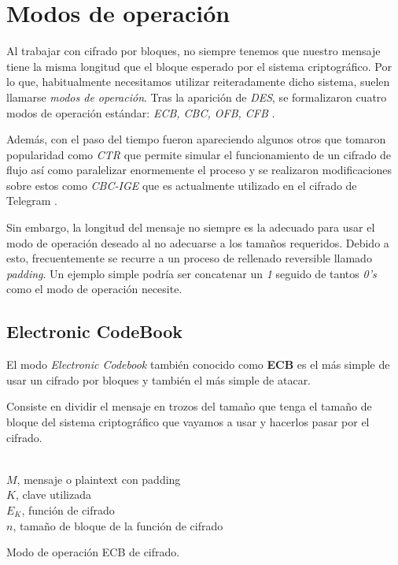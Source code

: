 \chapter{Modos de operación}
\label{chp:modes}

Al trabajar con cifrado por bloques, no siempre tenemos que nuestro mensaje tiene la misma longitud que el bloque esperado por el sistema criptográfico. Por lo que, habitualmente necesitamos utilizar reiteradamente dicho sistema, suelen llamarse \textit{modos de operación}. Tras la aparición de \textit{DES}, se formalizaron cuatro modos de operación estándar: \textit{ECB, CBC, OFB, CFB} \cite{Crypto_Bases2}.

Además, con el paso del tiempo fueron apareciendo algunos otros que tomaron popularidad como \textit{CTR} que permite simular el funcionamiento de un cifrado de flujo así como paralelizar enormemente el proceso y se realizaron modificaciones sobre estos como \textit{CBC-IGE} que es actualmente utilizado en el cifrado de Telegram \cite{TFG_M-Verona}.

Sin embargo, la longitud del mensaje no siempre es la adecuado para usar el modo de operación deseado al no adecuarse a los tamaños requeridos. Debido a esto, frecuentemente se recurre a un proceso de rellenado reversible llamado \textit{padding}. Un ejemplo simple podría ser concatenar un \textit{1} seguido de tantos \textit{0's} como el modo de operación necesite.


\section{Electronic CodeBook}
\label{sec:ECB}
El modo \textit{Electronic Codebook} también conocido como \textbf{ECB} es el más simple de usar un cifrado por bloques y también el más simple de atacar.

Consiste en dividir el mensaje en trozos del tamaño que tenga el tamaño de bloque del sistema criptográfico que vayamos a usar y hacerlos pasar por el cifrado.

\begin{algorithm}[H]
	\begin{algorithmic}[1]
		\small
		\REQUIRE \ \\
			\texttt{$M$}, mensaje o plaintext con padding\\
			\texttt{$K$}, clave utilizada\\
			\texttt{$E_K$}, función de cifrado\\
			\texttt{$n$}, tamaño de bloque de la función de cifrado\\
		
		\ENDFOR
	\end{algorithmic}

	\caption{Modo de operación ECB de cifrado.}
	\label{alg:ECB}
\end{algorithm}

